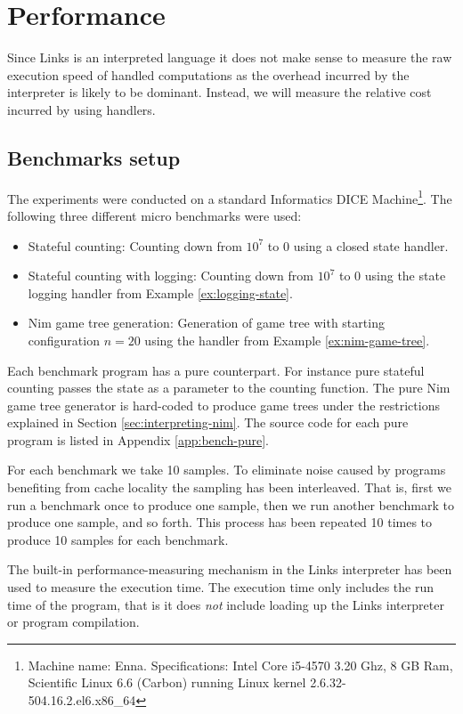 \section{Performance}\label{sec:eval-performance}
Since Links is an interpreted language it does not make sense to measure the raw execution speed of handled computations as the overhead incurred by the interpreter is likely to be dominant. Instead, we will measure the relative cost incurred by using handlers.

\subsection{Benchmarks setup}
The experiments were conducted on a standard Informatics DICE Machine\footnote{Machine name: Enna. Specifications: Intel Core i5-4570 3.20 Ghz, 8 GB Ram, Scientific Linux 6.6 (Carbon) running Linux kernel 2.6.32-504.16.2.el6.x86\_64}. The following three different micro benchmarks were used:
\begin{itemize}
  \item Stateful counting: Counting down from $10^7$ to $0$ using a closed state handler.
  \item Stateful counting with logging: Counting down from $10^7$ to $0$ using the state logging handler from Example \ref{ex:logging-state}.
  \item Nim game tree generation: Generation of game tree with starting configuration $n = 20$ using the handler from Example \ref{ex:nim-game-tree}.
\end{itemize}
Each benchmark program has a pure counterpart. For instance pure stateful counting passes the state as a parameter to the counting function. The pure Nim game tree generator is hard-coded to produce game trees under the restrictions explained in Section \ref{sec:interpreting-nim}. The source code for each pure program is listed in Appendix \ref{app:bench-pure}.

For each benchmark we take 10 samples. To eliminate noise caused by programs benefiting from cache locality the sampling has been interleaved. That is, first we run a benchmark once to produce one sample, then we run another benchmark to produce one sample, and so forth. This process has been repeated 10 times to produce 10 samples for each benchmark.

The built-in performance-measuring mechanism in the Links interpreter has been used to measure the execution time. The execution time only includes the run time of the program, that is it does \emph{not} include loading up the Links interpreter or program compilation.

